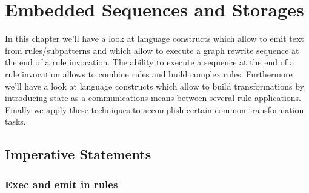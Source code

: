 \chapter{Embedded Sequences and Storages}
\label{cha:imperativeandstate}

In this chapter we'll have a look at language constructs which allow to emit text from rules/subpatterns and which allow to execute a graph rewrite sequence at the end of a rule invocation.
The ability to execute a sequence at the end of a rule invocation allows to combine rules and build complex rules.
Furthermore we'll have a look at language constructs which allow to build transformations by introducing state as a communications means between several rule applications.
Finally we apply these techniques to accomplish certain common transformation tasks.

\section{Imperative Statements} 
\label{sct:imperative}

\subsection{Exec and emit in rules}

